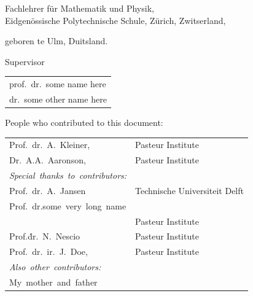 \begin{titlepage}
\begin{center}
\bigskip
\bigskip

Fachlehrer für Mathematik und Physik, \\
Eidgenössische Polytechnische Schule, Zürich, Zwitserland,

geboren te Ulm, Duitsland.

\vspace*{2\bigskipamount}

\end{center}

\clearpage
\thispagestyle{empty}

\noindent Supervisor 

\medskip\noindent
\begin{tabular}{l}
    prof.\ dr.\ some name here \\
    dr.\ some other name here
\end{tabular}

\bigskip
\noindent People who contributed to this document:

\medskip\noindent
\begin{tabular}{p{3cm}l}
    Prof.\ dr.\ A.\ Kleiner, & Pasteur Institute\\
    Dr.\ A.A.\ Aaronson, & Pasteur Institute \\

    \medskip
    \mbox{\emph{Special thanks to contributors:}} & \\

    Prof.\ dr.\ A.\ Jansen & Technische Universiteit Delft \\
    \mbox{Prof.\ dr.some very long name} & \\
      & Pasteur Institute \\
    Prof.\.dr.\ N.\ Nescio & Pasteur Institute  \\
    Prof.\ dr.\ ir.\ J.\ Doe, & Pasteur Institute  \\

    \medskip
    \mbox{\emph{Also other contributors:}} & \\
    \mbox{My mother and father} \\

\end{tabular}




\end{titlepage}
